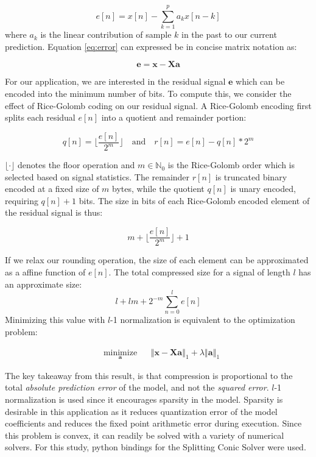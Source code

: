 \documentclass[journal]{IEEEtran}
\begin{document}
\begin{equation}
e[n] = x[n] - \sum_{k=1}^{p}a_{k}x[n-k]
\label{eq:error}
\end{equation}
where $a_k$ is the linear contribution of sample $k$ in the past to our current prediction. Equation \eqref{eq:error} can expressed be in concise matrix notation as: 

$$\mathbf{e} = \mathbf{x} - \mathbf{Xa}$$

For our application, we are interested in the residual signal $\mathbf{e}$ which can be encoded into the minimum number of bits. To compute this, we consider the effect of Rice-Golomb coding on our residual signal. A Rice-Golomb encoding first splits each residual $e[n]$ into a quotient and remainder portion:

$$ q[n] = \lfloor \frac{e[n]}{2^m} \rfloor\quad \textrm{and} \quad r[n] = e[n] - q[n] * 2^m  $$

$\lfloor \cdot \rfloor$ denotes the floor operation and $m \in \mathbb{N}_0$ is the Rice-Golomb order which is selected based on signal statistics\cite{Kiely2004}\cite{Merhav2000}. The remainder $r[n]$ is truncated binary encoded at a fixed size of $m$ bytes, while the quotient $q[n]$ is unary encoded, requiring $q[n] + 1$ bits. The size in bits of each Rice-Golomb encoded element of the residual signal is thus:

$$ m + \lfloor\frac{e[n]}{2^m}\rfloor + 1$$

If we relax our rounding operation, the size of each element can be approximated as a affine function of $e[n]$. The total compressed size for a signal of length $l$ has an approximate size:
 $$l+lm+ 2^{-m}\sum_{n=0}^l e[n]$$
 Minimizing this value with $l$-1 normalization is equivalent to the optimization problem:
 
\begin{equation}
\begin{aligned}
& \underset{\mathbf{a}}{\text{minimize}}
& & \left\Vert \mathbf{x}-\mathbf{Xa} \right\Vert_1 + \lambda\left\Vert \mathbf{a} \right\Vert_1
\label{eq:optimize}
\end{aligned}
\end{equation}

The key takeaway from this result, is that compression is proportional to the total \textit{absolute prediction error} of the model, and not the \textit{squared error}. $l$-1 normalization is used since it encourages sparsity in the model. Sparsity is desirable in this application as it reduces quantization error of the model coefficients and reduces the fixed point arithmetic error during execution. Since this problem is convex, it can readily be solved with a variety of numerical solvers. For this study, python bindings for the Splitting Conic Solver were used\cite{ocpb:16}\cite{scs}\cite{cvxpy}.
\end{document}

